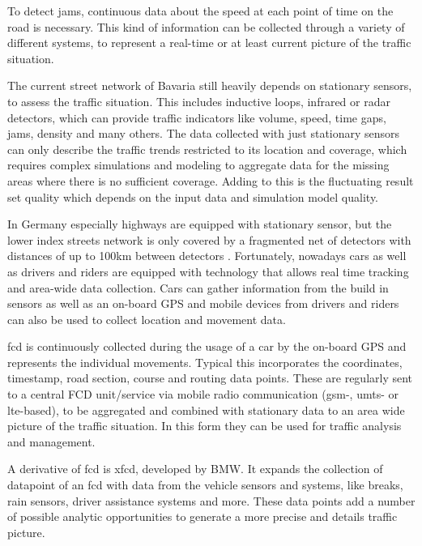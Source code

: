 \documentclass[a4paper,12pt]{report}
\begin{document}
To detect \glspl{jam}, continuous data about the speed at each point of time on the road is necessary. This kind of information can be collected through a variety of different systems, to represent a real-time or at least current picture of the traffic situation. 

The current street network of Bavaria still heavily depends on stationary sensors, to assess the traffic situation. This includes inductive loops, infrared or radar detectors, which can provide traffic indicators like volume, speed, time gaps, jams, density and many others. The data collected with just stationary sensors can only describe the traffic trends restricted to its location and coverage, which requires complex simulations and modeling to aggregate data for the missing areas where there is no sufficient coverage. Adding to this is the fluctuating result set quality which depends on the input data and simulation model quality. 

In Germany especially highways are equipped with stationary sensor, but the lower index streets network is only covered by a fragmented net of detectors with distances of up to 100km between detectors \cite{INDRIX2015}. Fortunately, nowadays cars as well as drivers and riders are equipped with technology that allows real time tracking and area-wide data collection. Cars can gather information from the build in sensors as well as an on-board GPS and mobile devices from drivers and riders can also be used to collect location and movement data. \cite{Randelhoff2016}

\acrfull{fcd} is continuously collected during the usage of a car by the on-board GPS and represents the individual movements. Typical this incorporates the coordinates, timestamp, road section, course and routing data points. These are regularly sent to a central FCD unit/service via mobile radio communication (\acrshort{gsm}-, \acrshort{umts}- or \acrshort{lte}-based), to be aggregated and combined with stationary data to an area wide picture of the traffic situation. In this form they can be used for traffic analysis and management. \cite{Randelhoff2016,LAPID2020}

A derivative of \acrshort{fcd} is \acrfull{xfcd}, developed by BMW. It expands the collection of datapoint of an \acrshort{fcd} with data from the vehicle sensors and systems, like breaks, rain sensors, driver assistance systems and more. These data points add a number of possible analytic opportunities to generate a more precise and details traffic picture. \cite{LAPID2020}
\end{document}
